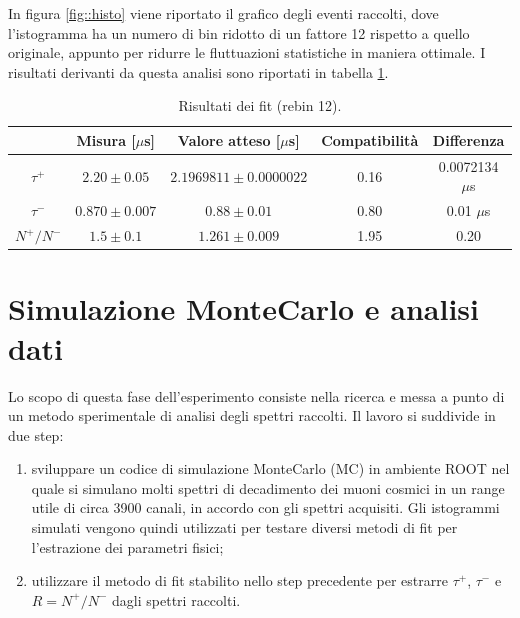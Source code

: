 \documentclass[10pt, oneside, a4paper]{article}   	%
\begin{document}
%
In figura \ref{fig::histo} viene riportato il grafico degli eventi raccolti, dove l'istogramma ha un numero di bin ridotto di un fattore 12 rispetto a quello originale, appunto per ridurre le fluttuazioni statistiche in maniera ottimale. I risultati derivanti da questa analisi sono riportati in tabella \ref{results}.
\begin{table}[H]
	\centering
	\begin{tabular}{ccccc}
		\toprule
		& Misura [$\mu$s]	&	Valore atteso [$\mu$s]	 & Compatibilità & Differenza 	\\	
		\midrule
		$\tau^+$	&	$2.20\pm 0.05$ & $2.1969811 \pm 0.0000022$ & 0.16 & 0.0072134 $\mu$s	\\
		$\tau^-$	&	$0.870\pm 0.007$ & $0.88 \pm 0.01$ & 0.80 & 0.01 $\mu$s	\\
		$N^+/N^-$	&	$1.5 \pm 0.1$ & $1.261 \pm 0.009$ & 1.95 & 0.20	\\
		\bottomrule
	\end{tabular}
	\caption{Risultati dei fit (rebin 12).}
	\label{results}
\end{table}
\newpage
\section{Simulazione MonteCarlo e analisi dati}
Lo scopo di questa fase dell'esperimento consiste nella ricerca e messa a punto di un metodo sperimentale di analisi degli spettri raccolti. Il lavoro si suddivide in due step:
\begin{enumerate}
 \item sviluppare un codice di simulazione MonteCarlo (MC) in ambiente ROOT nel quale si simulano molti spettri di decadimento dei muoni cosmici in un range utile di circa 3900 canali, in accordo con gli spettri acquisiti. Gli istogrammi simulati vengono quindi utilizzati per testare diversi metodi di fit per l'estrazione dei parametri fisici;
 \item utilizzare il metodo di fit stabilito nello step precedente per estrarre $\tau^+$, $\tau^-$ e $R=N^+/N^-$ dagli spettri raccolti.
\end{enumerate}
%
\end{document}
